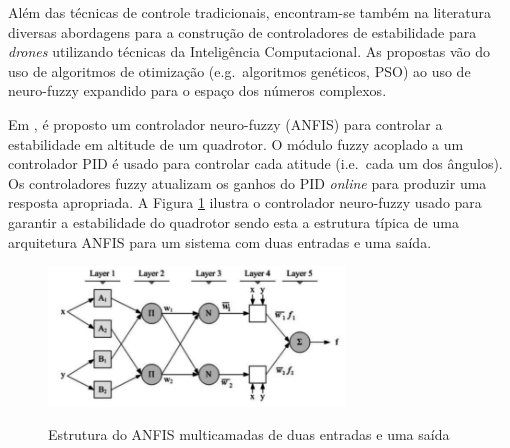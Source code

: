 Além das técnicas de controle tradicionais, encontram-se também na literatura diversas abordagens para a construção de controladores de estabilidade para \textit{drones} utilizando técnicas da Inteligência Computacional. As propostas vão do uso de algoritmos de otimização (e.g.\ algoritmos genéticos, PSO) ao uso de neuro-fuzzy expandido para o espaço dos números complexos.

Em \cite{Rezazadeh2013}, é proposto um controlador neuro-fuzzy (ANFIS) para controlar a estabilidade em altitude de um quadrotor. O módulo fuzzy acoplado a um controlador PID é usado para controlar cada atitude (i.e.\ cada um dos ângulos). Os controladores fuzzy atualizam os ganhos do PID \textit{online} para produzir uma resposta apropriada. A Figura \ref{fig:Rezazadeh2013_estrutura_anfis} ilustra o controlador neuro-fuzzy usado para garantir a estabilidade do quadrotor sendo esta a estrutura típica de uma arquitetura ANFIS para um sistema com duas entradas e uma saída.

\begin{figure}[!htb]
    \centering
    \caption{Estrutura do ANFIS multicamadas de duas entradas e uma saída}
    \includegraphics[width=0.7\textwidth]{./04-figuras/Rezazadeh2013_estrutura_anfis_gray}
    \label{fig:Rezazadeh2013_estrutura_anfis}
\end{figure}

